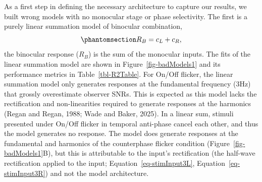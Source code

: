 \documentclass[
  12pt,
]{article}
\begin{document}
As a first step in defining the necessary architecture to capture our
results, we built wrong models with no monocular stage or phase
selectivity. The first is a purely linear summation model of binocular
combination, \begin{equation}\phantomsection\label{eq-linearSumModel}{
R_B = c_L+c_R,
}\end{equation} the binocular response (\(R_B\)) is the sum of the
monocular inputs. The fits of the linear summation model are shown in
Figure~\ref{fig-badModels1} and its performance metrics in
Table~\ref{tbl-R2Table}. For On/Off flicker, the linear summation model
only generates responses at the fundamental frequency (3Hz) that grossly
overestimate observer SNRs. This is expected as this model lacks the
rectification and non-linearities required to generate responses at the
harmonics (Regan and Regan, 1988; Wade and Baker, 2025). In a linear
sum, stimuli presented under On/Off flicker in temporal anti-phase
cancel each other, and thus the model generates no response. The model
does generate responses at the fundamental and harmonics of the
counterphase flicker condition (Figure~\ref{fig-badModels1}B), but this
is attributable to the input's rectification (the half-wave
rectification applied to the input;
Equation~\ref{eq-stimInput3L}, Equation~\ref{eq-stimInput3R}) and not
the model architecture.
\end{document}
